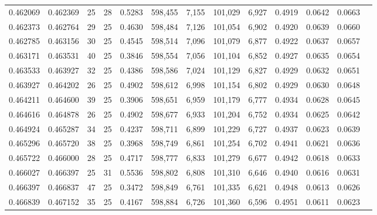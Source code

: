 \begin{tabular}{rrrrrrrrrrrrr}
0.462069 & 0.462369 &    25 &  28 &                                     0.5283 & 598,455 &   7,155 & 101,029 &   6,927 & 0.4919 & 0.0642 & 0.0663 \\
0.462373 & 0.462764 &    29 &  25 &                                     0.4630 & 598,484 &   7,126 & 101,054 &   6,902 & 0.4920 & 0.0639 & 0.0660 \\
0.462785 & 0.463156 &    30 &  25 &                                     0.4545 & 598,514 &   7,096 & 101,079 &   6,877 & 0.4922 & 0.0637 & 0.0657 \\
0.463171 & 0.463531 &    40 &  25 &                                     0.3846 & 598,554 &   7,056 & 101,104 &   6,852 & 0.4927 & 0.0635 & 0.0654 \\
0.463533 & 0.463927 &    32 &  25 &                                     0.4386 & 598,586 &   7,024 & 101,129 &   6,827 & 0.4929 & 0.0632 & 0.0651 \\
0.463927 & 0.464202 &    26 &  25 &                                     0.4902 & 598,612 &   6,998 & 101,154 &   6,802 & 0.4929 & 0.0630 & 0.0648 \\
0.464211 & 0.464600 &    39 &  25 &                                     0.3906 & 598,651 &   6,959 & 101,179 &   6,777 & 0.4934 & 0.0628 & 0.0645 \\
0.464616 & 0.464878 &    26 &  25 &                                     0.4902 & 598,677 &   6,933 & 101,204 &   6,752 & 0.4934 & 0.0625 & 0.0642 \\
0.464924 & 0.465287 &    34 &  25 &                                     0.4237 & 598,711 &   6,899 & 101,229 &   6,727 & 0.4937 & 0.0623 & 0.0639 \\
0.465296 & 0.465720 &    38 &  25 &                                     0.3968 & 598,749 &   6,861 & 101,254 &   6,702 & 0.4941 & 0.0621 & 0.0636 \\
0.465722 & 0.466000 &    28 &  25 &                                     0.4717 & 598,777 &   6,833 & 101,279 &   6,677 & 0.4942 & 0.0618 & 0.0633 \\
0.466027 & 0.466397 &    25 &  31 &                                     0.5536 & 598,802 &   6,808 & 101,310 &   6,646 & 0.4940 & 0.0616 & 0.0631 \\
0.466397 & 0.466837 &    47 &  25 &                                     0.3472 & 598,849 &   6,761 & 101,335 &   6,621 & 0.4948 & 0.0613 & 0.0626 \\
0.466839 & 0.467152 &    35 &  25 &                                     0.4167 & 598,884 &   6,726 & 101,360 &   6,596 & 0.4951 & 0.0611 & 0.0623 \\

\end{tabular}
